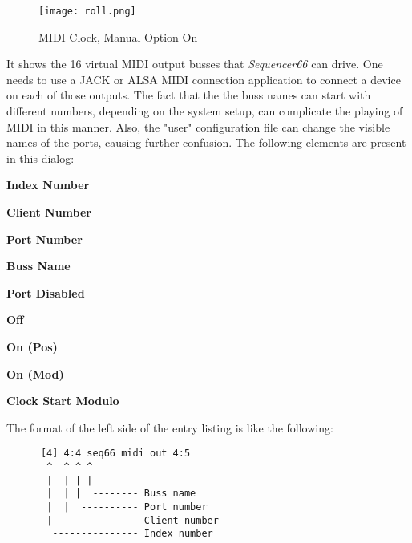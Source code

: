 
\begin{figure}[H]
   \centering 
   \texttt{[image: roll.png]}
   \caption{MIDI Clock, Manual Option On}
   \label{fig:seq66_midi_clock_4_devices_manual_1}
\end{figure}

   It shows the 16 virtual MIDI output busses that \textsl{Sequencer66} can
   drive.  One needs to use a JACK or ALSA MIDI
   connection application to connect a device on each of those outputs.  The
   fact that the the buss names can
   start with different numbers, depending on the system setup, can complicate
   the playing of MIDI in this manner.  Also, the "user" configuration file can
   change the visible names of the ports, causing further confusion.
   The following elements are present in this dialog:

   \begin{enumber}
      \item \textbf{Index Number}
      \item \textbf{Client Number}
      \item \textbf{Port Number}
      \item \textbf{Buss Name}
      \item \textbf{Port Disabled}
      \item \textbf{Off}
      \item \textbf{On (Pos)}
      \item \textbf{On (Mod)}
      \item \textbf{Clock Start Modulo}
   \end{enumber}

   The format of the left side of the entry listing is like the following:

   \begin{verbatim}
      [4] 4:4 seq66 midi out 4:5
       ^  ^ ^ ^
       |  | | |
       |  | |  -------- Buss name
       |  |  ---------- Port number
       |   ------------ Client number
        --------------- Index number
   \end{verbatim}

